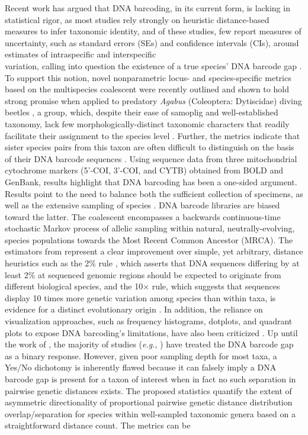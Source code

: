 \documentclass[12pt]{article}
\begin{document}
Recent work has argued that DNA barcoding, in its current form, is lacking in statistical rigor, as most studies rely strongly on heuristic distance-based measures to infer taxonomic identity, and of these studies, few report measures of uncertainty, such as standard errors (SEs) and confidence intervals (CIs), around estimates of intraspecific and interspecific \\ variation, calling into question the existence of a true species' DNA barcode gap \citep{phillips2022lack}. To support this notion, novel nonparametric locus- and species-specific metrics based on the multispecies coalescent \citep{rannala2003bayes, yang2017bayesian} were recently outlined and shown to hold strong promise when applied to predatory \textit{Agabus} (Coleoptera: Dytiscidae) diving beetles \citep{phillips2024measure}, a group, which, despite their ease of samoplig and well-established taxonomy, lack few morphologically-distinct taxonomic characters that readily facilitate their assignment to the species level \citep{bergsten2012effect}. Further, the metrics indicate that sister species pairs from this taxon are often difficult to distinguish on the basis of their DNA barcode sequences \citep{phillips2024measure}. Using sequence data from three mitochondrial cytochrome markers (5'-COI, 3'-COI, and CYTB) obtained from BOLD and GenBank, results highlight that DNA barcoding has been a one-sided argument. Results point to the need to balance both the sufficient collection of specimens, as well as the extensive sampling of species \citep{phillips2024measure}. DNA barcode libraries are biased toward the latter. The coalescent \citep{kingman1982coalescent} encompasses a backwards continuous-time stochastic Markov process of allelic sampling within natural, neutrally-evolving, species populations towards the Most Recent Common Ancestor (MRCA). The estimators from \citep{phillips2024measure} represent a clear improvement over simple, yet arbitrary, distance heuristics such as the 2\% rule \citep{hebert2003biological}, which asserts that DNA sequences differing by at least 2\% at sequenced genomic regions should be expected to originate from different biological species, and the 10$\times$ rule, which suggests that sequences display 10 times more genetic variation among species than within taxa,  is evidence for a distinct evolutionary origin \citep{hebert2004identification}. In addition, the reliance on visualization approaches, such as frequency histograms, dotplots, and quadrant plots to expose DNA barcoding's limitations, have also been criticized \cite{collins2013seven, phillips2022lack}. Up until the work of \cite{phillips2024measure}, the majority of studies (\textit{e.g.}, \citet{young2021macer}) have treated the DNA barcode gap as a binary response. However, given poor sampling depth for most taxa, a Yes/No dichotomy is inherently flawed because it can falsely imply a DNA barcode gap is present for a taxon of interest when in fact no such separation in pairwise genetic distances exists. The proposed statistics quantify the extent of asymmetric directionality of proportional pairwise genetic distance distribution overlap/separation for species within well-sampled taxonomic genera based on a straightforward distance count. The metrics can be 
\end{document}
